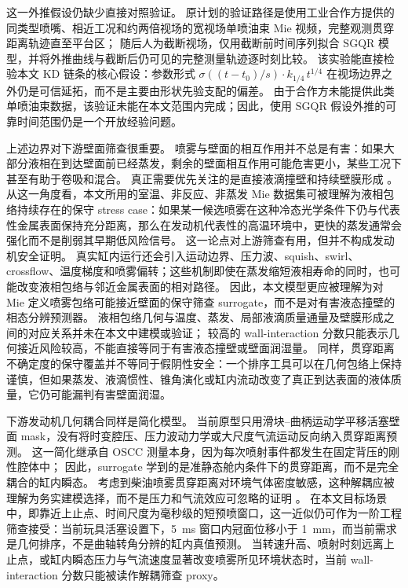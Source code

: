 这一外推假设仍缺少直接对照验证。
原计划的验证路径是使用工业合作方提供的同类型喷嘴、相近工况和约两倍视场的宽视场单喷油束 Mie 视频，完整观测贯穿距离轨迹直至平台区；
随后人为截断视场，仅用截断前时间序列拟合 \(\mathrm{SGQR}\) 模型，并将外推曲线与截断后仍可见的完整测量轨迹逐时刻比较。
该实验能直接检验本文 KD 链条的核心假设：参数形式 \(\sigma\!\left((t-t_0)/s\right)\cdot k_{1/4}\,t^{1/4}\) 在视场边界之外仍是可信延拓，而不是主要由形状先验支配的偏差。
由于合作方未能提供此类单喷油束数据，该验证未能在本文范围内完成；因此，使用 \(\mathrm{SGQR}\) 假设外推的可靠时间范围仍是一个开放经验问题。

上述边界对下游壁面筛查很重要。
喷雾与壁面的相互作用并不总是有害：如果大部分液相在到达壁面前已经蒸发，剩余的壁面相互作用可能危害更小，某些工况下甚至有助于卷吸和混合。
真正需要优先关注的是直接液滴撞壁和持续壁膜形成 \cite{MorieiraMotaPanao2010,liu2024marine_impingement,peraza2022swi,ahmad2025fueldilution}。
从这一角度看，本文所用的室温、非反应、非蒸发 Mie 数据集可被理解为液相包络持续存在的保守 stress case：如果某一候选喷雾在这种冷态光学条件下仍与代表性金属表面保持充分距离，那么在发动机代表性的高温环境中，更快的蒸发通常会强化而不是削弱其早期低风险信号。
这一论点对上游筛查有用，但并不构成发动机安全证明。
真实缸内运行还会引入运动边界、压力波、squish、swirl、crossflow、温度梯度和喷雾偏转；这些机制即使在蒸发缩短液相寿命的同时，也可能改变液相包络与邻近金属表面的相对路径。
因此，本文模型更应被理解为对 Mie 定义喷雾包络可能接近壁面的保守筛查 surrogate，而不是对有害液态撞壁的相态分辨预测器。
液相包络几何与温度、蒸发、局部液滴质量通量及壁膜形成之间的对应关系并未在本文中建模或验证；
较高的 wall-interaction 分数只能表示几何接近风险较高，不能直接等同于有害液态撞壁或壁面润湿量。
同样，贯穿距离不确定度的保守覆盖并不等同于假阴性安全：一个排序工具可以在几何包络上保持谨慎，但如果蒸发、液滴惯性、锥角演化或缸内流动改变了真正到达表面的液体质量，它仍可能漏判有害壁面润湿。

下游发动机几何耦合同样是简化模型。
当前原型只用滑块--曲柄运动学平移活塞壁面 mask，没有将时变腔压、压力波动力学或大尺度气流运动反向纳入贯穿距离预测。
这一简化继承自 OSCC 测量本身，因为每次喷射事件都发生在固定背压的刚性腔体中；
因此，surrogate 学到的是准静态舱内条件下的贯穿距离，而不是完全耦合的缸内瞬态。
考虑到柴油喷雾贯穿距离对环境气体密度敏感，这种解耦应被理解为务实建模选择，而不是压力和气流效应可忽略的证明 \cite{NaberSiebers1996}。
在本文目标场景中，即靠近上止点、时间尺度为毫秒级的短预喷窗口，这一近似仍可作为一阶工程筛查接受：当前玩具活塞设置下，\SI{5}{ms} 窗口内冠面位移小于 \SI{1}{mm}，而当前需求是几何排序，不是曲轴转角分辨的缸内真值预测。
当转速升高、喷射时刻远离上止点，或缸内瞬态压力与气流速度显著改变喷雾所见环境状态时，当前 wall-interaction 分数只能被读作解耦筛查 proxy。

